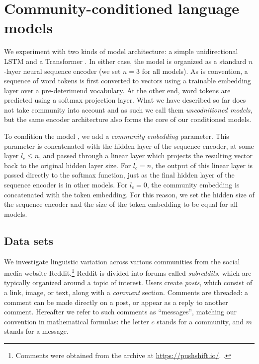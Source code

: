 \documentclass[11pt]{article}
\begin{document}
\section{Community-conditioned language models}\label{sec:cclm}

We experiment with two kinds of model architecture: a simple
unidirectional LSTM \citep{Hochreiter1997} and a Transformer
\citep{Vaswani2017}.  In either case, the model is organized as a
standard $n$-layer neural sequence encoder (we set $n=3$ for all
models). As is convention, a sequence of word tokens is first converted to 
vectors using a trainable embedding layer over a pre-deterimend vocabulary.
At the other end, word tokens are predicted using a softmax projection 
layer. What we have described so far does not take community into account
and as such we call them \emph{uncodnitioned models}, but the same
encoder architecture also forms the core of our conditioned models.

To condition the model , we add a \emph{community embedding} parameter.
This parameter is concatenated with the hidden layer of the
sequence encoder, at some layer $l_c \leq n$, and passed through a
linear layer which projects the resulting vector back to the original
hidden layer size.  For $l_c = n$, the output of this linear layer is
passed directly to the softmax function, just as the final hidden
layer of the sequence encoder is in other models.  For $l_c=0$, the
community embedding is concatenated with the token embedding.  For
this reason, we set the hidden size of the sequence encoder and the
size of the token embedding to be equal for all models.


\subsection{Data sets}

We investigate linguistic variation across various communities 
from the social media website Reddit.\footnote{Comments were obtained
  from the archive at \url{https://pushshift.io/}.
  \cite{Baumgartner2020}.}
%
Reddit is divided into forums called \textit{subreddits}, 
which are typically organized around a topic of interest. 
Users create \textit{posts}, which consist of a link, image, 
or text, along with a \emph{comment} section. 
Comments are threaded: a comment can be made directly on a post,
or appear as a reply to another comment.
%
Hereafter we refer to such comments as ``messages'', matching our
convention in mathematical formulas: the letter $c$ stands for a
community, and $m$ stands for a message.
\end{document}
